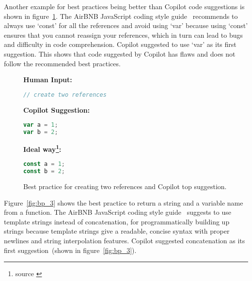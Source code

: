 Another example for best practices being better than Copilot code suggestions is shown in figure~\ref{fig:bp_2}. 
The AirBNB JavaScript coding style guide~\cite{airbnb_code} recommends to always use `const' for all the references and avoid using `var' because using `const' ensures that you cannot reassign your references, which in turn can lead to bugs and difficulty in code comprehension.
Copilot suggested to use `var' as its first suggestion.
This shows that code suggested by Copilot has flaws and does not follow the recommended best practices.

\begin{figure}[hbt!]
    \centering
\begin{tcolorbox}[title=Create two references,boxsep=.15mm]
\textbf{Human Input:}
\begin{lstlisting}[language=JavaScript]
// create two references
\end{lstlisting}
\tcbline
\textbf{Copilot Suggestion:}
\begin{lstlisting}[language=JavaScript]
var a = 1;
var b = 2;
\end{lstlisting}
\tcbline
\textbf{Ideal way\footnote{source \cite{airbnb_code}}:}
\begin{lstlisting}[language=JavaScript]
const a = 1;
const b = 2;
\end{lstlisting}
\end{tcolorbox}
    \caption{Best practice for creating two references and Copilot top suggestion.}
    \label{fig:bp_2}
\end{figure}

Figure~\ref{fig:bp_3} shows the best practice to return a string and a variable name from a function. 
The AirBNB JavaScript coding style guide~\cite{airbnb_code} suggests to use template strings instead of concatenation, for programmatically building up strings because template strings give a readable, concise syntax with proper newlines and string interpolation features.
Copilot suggested concatenation as its first suggestion~(shown in figure~\ref{fig:bp_3}).


